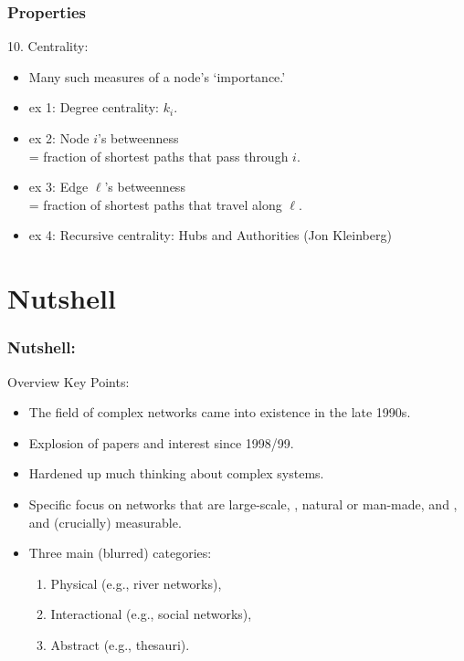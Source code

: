 \begin{frame}
  \frametitle{Properties}

  \begin{block}{10. Centrality:}
    \begin{itemize}
    \item<2-> Many such measures of a node's `importance.'  
    \item<3-> \alert{ex 1:} Degree centrality: $k_i$.
    \item<4-> \alert{ex 2:} Node $i$'s betweenness \\
      = fraction of shortest paths that pass through $i$.
    \item<5-> \alert{ex 3:} Edge $\ell$'s betweenness \\
      = fraction of shortest paths that travel along $\ell$.
    \item<6-> \alert{ex 4:} Recursive centrality: Hubs and Authorities
      (Jon Kleinberg\cite{kleinberg1998a})
    \end{itemize}
    
  \end{block}

\end{frame}




\section{Nutshell}

\begin{frame}[label=]
  \frametitle{Nutshell:}

  \begin{block}{Overview Key Points:}
    \begin{itemize}
    \item<1->
      The field of complex networks came into
      existence in the late 1990s.
    \item<2->
      Explosion of papers and interest since 1998/99.
    \item<3->
      Hardened up much thinking about complex systems.
    \item<4->
      Specific focus on networks that are 
      \alert{large-scale}, 
      , 
      \alert{natural} or \alert{man-made}, 
       and , 
      and 
      (crucially) \alert{measurable}.
    \item<5->
      Three main (blurred) categories: 
      \begin{enumerate}
      \item 
      \alert{Physical} (e.g., river networks),
      \item 
      \alert{Interactional} (e.g., social networks),
      \item 
      \alert{Abstract} (e.g., thesauri).
      \end{enumerate}
    \end{itemize}
    
  \end{block}

\end{frame}


